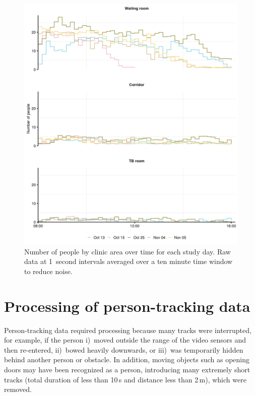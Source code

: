 \documentclass[fleqn,11pt]{wlscirep_supp}
\begin{document}
\begin{figure}[!htpb]
    \centering
    \includegraphics{results/data/no-people-over-time-by-day.png}
    \caption{Number of people by clinic area over time for each study day. Raw data at 1~second intervals  averaged over a ten minute time window to reduce noise.}
    \label{fig:people-over-time-by-day}
\end{figure}

\clearpage

\section{Processing of person-tracking data}\label{sec:setting-and-data}

Person-tracking data required processing because many tracks were interrupted, for example, if the person i)~moved outside the range of the video sensors and then re-entered, ii)~bowed heavily downwards, or iii)~was temporarily hidden behind another person or obstacle. In addition, moving objects such as opening doors may have been recognized as a person, introducing many extremely short tracks (total duration of less than 10\,s and distance less than 2\,m), which were removed.
\end{document}
